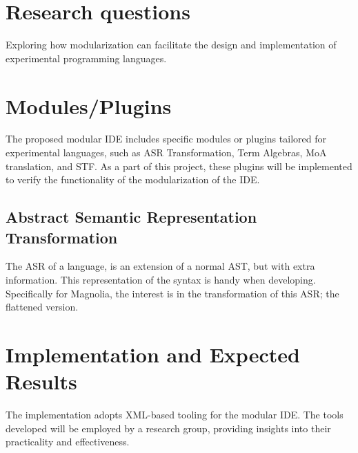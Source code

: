 \documentclass[runningheads]{llncs}
\begin{document}
\section{Research questions} 

Exploring how modularization can facilitate the design and implementation of experimental programming languages.

\section{Modules/Plugins}

The proposed modular IDE includes specific modules or plugins tailored for experimental languages, such as ASR Transformation, Term Algebras, MoA translation, and STF. As a part of this project, these plugins will be implemented to verify the functionality of the modularization of the IDE.

\subsection{Abstract Semantic Representation Transformation}

The ASR of a language, is an extension of a normal AST, but with extra information. This representation of the syntax is handy when developing. Specifically for Magnolia, the interest is in the transformation of this ASR; the flattened version.  


\section{Implementation and Expected Results}

The implementation adopts XML-based tooling for the modular IDE. The tools developed will be employed by a research group, providing insights into their practicality and effectiveness.
\end{document}
